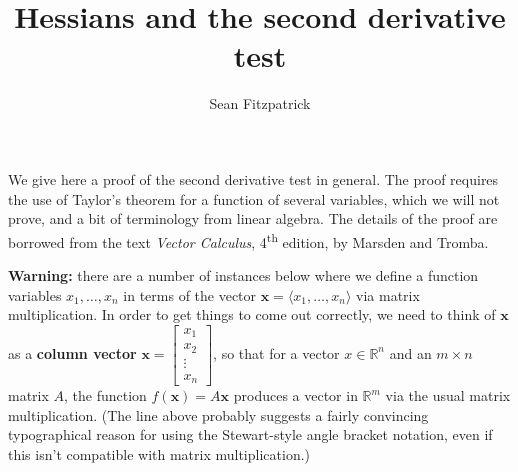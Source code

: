 \documentclass[12pt,letterpaper]{article}
\title{Hessians and the second derivative test}
\author{Sean Fitzpatrick}
\newcommand{\R}{\mathbb{R}}
\newcommand{\x}{\mathbf{x}}
\begin{document}
\maketitle

We give here a proof of the second derivative test in general. The proof requires the use of Taylor's theorem for a function of several variables, which we will not prove, and a bit of terminology from linear algebra. The details of the proof are borrowed from the text {\em Vector Calculus}, 4\textsuperscript{th} edition, by Marsden and Tromba. 

{\bf Warning:} there are a number of instances below where we define a function variables $x_1,\ldots, x_n$ in terms of the vector $\x=\langle x_1,\ldots, x_n\rangle$ via matrix multiplication. In order to get things to come out correctly, we need to think of $\x$ as a {\bf column vector} $\displaystyle \x = \begin{bmatrix}x_1\\x_2\\\vdots\\x_n\end{bmatrix}$, so that for a vector $x\in\R^n$ and an $m\times n$ matrix $A$, the function $f(\x)=A\x$ produces a vector in $\R^m$ via the usual matrix multiplication. (The line above probably suggests a fairly convincing typographical reason for using the Stewart-style angle bracket notation, even if this isn't compatible with matrix multiplication.)
\end{document}
